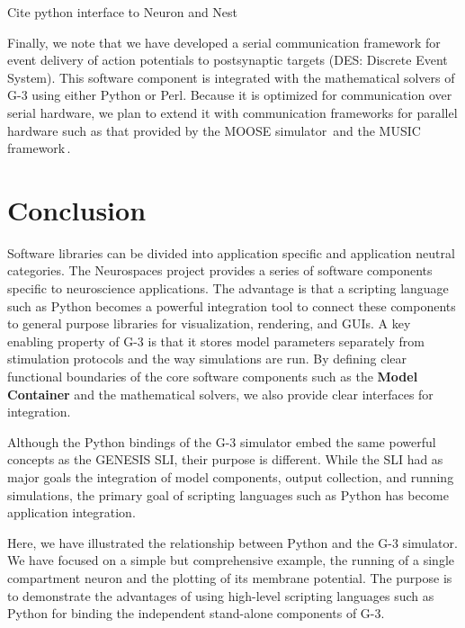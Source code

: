 \documentclass[12pt]{article}
\begin{document}
Cite python interface to Neuron and Nest

Finally, we note that we have developed a serial communication
framework for event delivery of action potentials to postsynaptic
targets (DES: Discrete Event System).  This software component is
integrated with the mathematical solvers of G-3 using either Python or
Perl.  Because it is optimized for communication over serial hardware,
we plan to extend it with communication frameworks for parallel
hardware such as that provided by the MOOSE
simulator\,\cite{ray08:_pymoos} and the MUSIC
framework\,\cite{ekeberg08:_music_multis_coord}.


\vspace*{-4mm}
\section{Conclusion}

Software libraries can be divided into application specific and
application neutral categories.  The Neurospaces project provides a
series of software components specific to neuroscience applications.
The advantage is that a scripting language such as Python becomes a
powerful integration tool to connect these components to general
purpose libraries for visualization, rendering, and GUIs.  A key
enabling property of G-3 is that it stores model parameters separately
from stimulation protocols and the way simulations are run.  By
defining clear functional boundaries of the core software components
such as the {\bf Model\,Container} and the mathematical solvers, we also
provide clear interfaces for integration.

Although the Python bindings of the G-3 simulator embed the same
powerful concepts as the GENESIS SLI, their purpose is different.
While the SLI had as major goals the integration of model components,
output collection, and running simulations, the primary goal of
scripting languages such as Python has become application integration.

Here, we have illustrated the relationship between Python and the G-3
simulator.  We have focused on a simple but comprehensive example, the
running of a single compartment neuron and the plotting of its
membrane potential. The purpose is to demonstrate the advantages of
using high-level scripting languages such as Python for binding the
independent stand-alone components of G-3.
\end{document}
